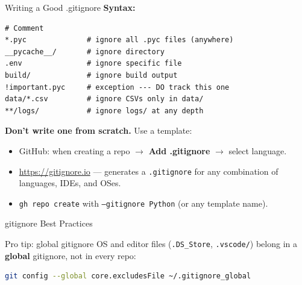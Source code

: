 \documentclass[aspectratio=169, 11pt]{beamer}
\begin{document}
\begin{frame}[fragile]{Writing a Good .gitignore}
  \textbf{Syntax:}
  \begin{lstlisting}[language={}, basicstyle=\ttfamily\scriptsize]
# Comment
*.pyc              # ignore all .pyc files (anywhere)
__pycache__/       # ignore directory
.env               # ignore specific file
build/             # ignore build output
!important.pyc     # exception --- DO track this one
data/*.csv         # ignore CSVs only in data/
**/logs/           # ignore logs/ at any depth
  \end{lstlisting}

  \vspace{0.3em}
  \textbf{Don't write one from scratch.} Use a template:
  \begin{itemize}
    \item GitHub: when creating a repo $\to$ \textbf{Add .gitignore} $\to$ select language.
    \item \url{https://gitignore.io} --- generates a \texttt{.gitignore} for any combination of languages, IDEs, and OSes.
    \item \texttt{gh repo create} with \texttt{--gitignore Python} (or any template name).
  \end{itemize}
\end{frame}

\begin{frame}[fragile]{gitignore Best Practices}
  \vspace{0.3em}
  \begin{block}{Pro tip: global gitignore}
    OS and editor files (\texttt{.DS\_Store}, \texttt{.vscode/}) belong in a \textbf{global} gitignore, not in every repo:
    \begin{lstlisting}[language=bash, basicstyle=\ttfamily\scriptsize]
git config --global core.excludesFile ~/.gitignore_global
    \end{lstlisting}
  \end{block}
\end{frame}
\end{document}
